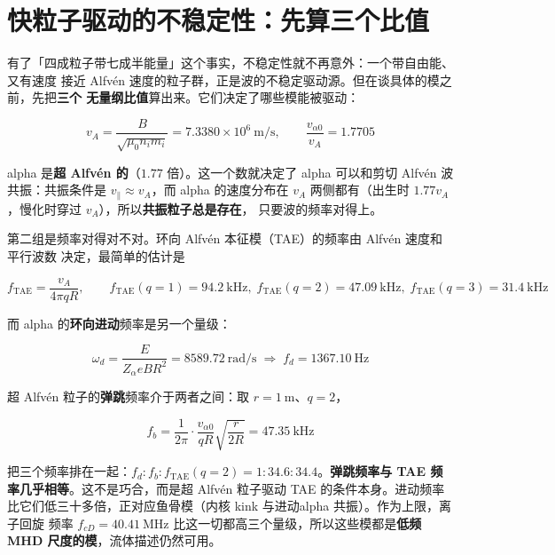 \section{快粒子驱动的不稳定性：先算三个比值}
\label{sec:app-w-instability}

有了「四成粒子带七成半能量」这个事实，不稳定性就不再意外：一个带自由能、又有速度
接近 Alfvén 速度的粒子群，正是波的不稳定驱动源。但在谈具体的模之前，先把\textbf{三个
无量纲比值}算出来。它们决定了哪些模能被驱动：

\begin{equation}
v_A = \frac{B}{\sqrt{\mu_0 n_i m_i}} = 7.3380\times10^{6}\ \mathrm{m/s},
\qquad
\frac{v_{\alpha 0}}{v_A} = 1.7705
\label{eq:app-w-va}
\end{equation}

alpha 是\textbf{超 Alfvén 的}（$1.77$ 倍）。这一个数就决定了 alpha 可以和剪切 Alfvén
波共振：共振条件是 $v_\parallel\approx v_A$，而 alpha 的速度分布在
$v_A$ 两侧都有（出生时 $1.77v_A$，慢化时穿过 $v_A$），所以\textbf{共振粒子总是存在}，
只要波的频率对得上。

第二组是频率对得对不对。环向 Alfvén 本征模（TAE）的频率由 Alfvén 速度和平行波数
决定，最简单的估计是

\begin{equation}
f_{\text{TAE}} = \frac{v_A}{4\pi qR},
\qquad f_{\text{TAE}}(q{=}1)=94.2\ \mathrm{kHz},\;
f_{\text{TAE}}(q{=}2)=47.09\ \mathrm{kHz},\;
f_{\text{TAE}}(q{=}3)=31.4\ \mathrm{kHz}
\label{eq:app-w-tae}
\end{equation}

而 alpha 的\textbf{环向进动}频率是另一个量级：

\begin{equation}
\omega_d = \frac{E}{Z_\alpha e B R^2} = 8589.72\ \mathrm{rad/s}
\;\Longrightarrow\; f_d = 1367.10\ \mathrm{Hz}
\label{eq:app-w-precess}
\end{equation}

超 Alfvén 粒子的\textbf{弹跳}频率介于两者之间：取 $r=1\ \mathrm{m}$、$q=2$，

\begin{equation}
f_b = \frac{1}{2\pi}\cdot\frac{v_{\alpha 0}}{qR}\sqrt{\frac{r}{2R}}
= 47.35\ \mathrm{kHz}
\label{eq:app-w-bounce}
\end{equation}

把三个频率排在一起：$f_d:f_b:f_{\text{TAE}}(q{=}2) = 1 : 34.6 : 34.4$。\textbf{弹跳频率与
TAE 频率几乎相等}。这不是巧合，而是超 Alfvén 粒子驱动 TAE 的条件本身。进动频率
比它们低三十多倍，正对应鱼骨模（内核 kink 与进动alpha 共振）。作为上限，离子回旋
频率 $f_{cD}=40.41\ \mathrm{MHz}$ 比这一切都高三个量级，所以这些模都是\textbf{低频
MHD 尺度的模}，流体描述仍然可用。

